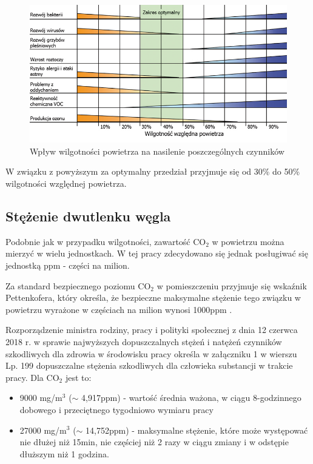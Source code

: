 \begin{figure}[H]
    \includegraphics[width=\textwidth]{zdj/wilgotnosc_powietrza_w_pomieszczeniach.jpg}
    \caption{Wpływ wilgotności powietrza na nasilenie poszczególnych czynników}
    \label{wilgot-wykres}
\end{figure}

W związku z powyższym za optymalny przedział przyjmuje się od 30\% do 50\% wilgotności względnej 
powietrza.

\subsection{Stężenie dwutlenku węgla}

Podobnie jak w przypadku wilgotności, zawartość CO$_2$ w powietrzu można mierzyć w wielu jednostkach. 
W tej pracy zdecydowano się jednak posługiwać się jednostką ppm - części na milion.

Za standard bezpiecznego poziomu CO$_2$ w pomieszczeniu przyjmuje się wskaźnik Pettenkofera, który określa, 
że bezpieczne maksymalne stężenie tego związku w powietrzu wyrażone w częściach na milion wynosi 1000ppm \cite{pettenhofer}.

Rozporządzenie ministra rodziny, pracy i polityki społecznej z dnia 12 czerwca 2018 r. w sprawie 
najwyższych dopuszczalnych stężeń i natężeń czynników szkodliwych dla zdrowia w środowisku \cite{min-stezenia} pracy określa w załączniku
1 w wierszu Lp. 199 dopuszczalne stężenia szkodliwych dla człowieka substancji w trakcie pracy. 
Dla CO$_2$ jest to:

\begin{itemize}
    \item 9000 mg/m$^3$ ($\sim$ 4,917ppm) - wartość średnia ważona, w ciągu 8-godzinnego dobowego i przeciętnego tygodniowo wymiaru pracy
    \item 27000 mg/m$^3$ ($\sim$ 14,752ppm) - maksymalne stężenie, które może występować nie dłużej niż 15min, nie częściej niż 2 razy w ciągu zmiany i w odstępie dłuższym niż 1 godzina.
\end{itemize}

